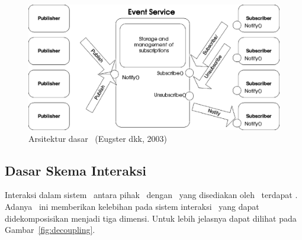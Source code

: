 \begin{figure}
    \centering
    \includegraphics[scale=0.20]
        {pics/arsitektur-pub-sub.png}
    \caption{Arsitektur dasar \pubsub~(Eugster dkk, 2003)}
\label{fig:arsitektur}
\end{figure}

\subsection{Dasar Skema Interaksi \PubSub}

Interaksi dalam sistem \pubsub~antara pihak \publisher~dengan \subscriber~yang
disediakan oleh \eventservice~terdapat \decoupling. Adanya \decoupling~ini
memberikan kelebihan pada sistem interaksi \pubsub~yang dapat didekomposisikan
menjadi tiga dimensi.  Untuk lebih jelasnya dapat dilihat pada
Gambar~\ref{fig:decoupling}.


